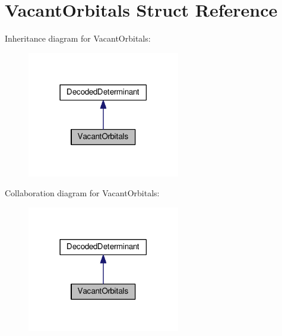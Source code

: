 \hypertarget{structVacantOrbitals}{}\section{Vacant\+Orbitals Struct Reference}
\label{structVacantOrbitals}


Inheritance diagram for Vacant\+Orbitals\+:
\nopagebreak
\begin{figure}[H]
\begin{center}
\leavevmode
\includegraphics[width=189pt]{structVacantOrbitals__inherit__graph}
\end{center}
\end{figure}


Collaboration diagram for Vacant\+Orbitals\+:
\nopagebreak
\begin{figure}[H]
\begin{center}
\leavevmode
\includegraphics[width=189pt]{structVacantOrbitals__coll__graph}
\end{center}
\end{figure}
